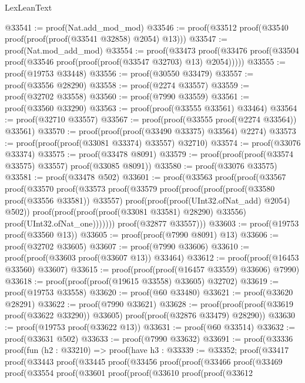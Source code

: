 \begin{lexlean}{LexLeanText}
\begin{coremodule}
@33541 := proof(Nat.add_mod_mod)
@33546 := proof(@33512 proof(@33540 proof(proof(proof(@33541 @32858) @2054) @13)))
@33547 := proof(Nat.mod_add_mod)
@33554 := proof(@33473
      proof(@33476 proof(@33504 proof(@33546 proof(proof(proof(@33547 @32703) @13) @2054)))))
@33555 := proof(@19753 @33448)
@33556 := proof(@30550 @33479)
@33557 := proof(@33556 @28290)
@33558 := proof(@2274 @33557)
@33559 := proof(@32702 @33558)
@33560 := proof(@7990 @33559)
@33561 := proof(@33560 @33290)
@33563 := proof(proof(@33555 @33561) @33464)
@33564 := proof(@32710 @33557)
@33567 := proof(proof(@33555 proof(@2274 @33564)) @33561)
@33570 := proof(proof(proof(@33490 @33375) @33564) @2274)
@33573 := proof(proof(proof(@33081 @33374) @33557) @32710)
@33574 := proof(@33076 @33374)
@33575 := proof(@33478 @8091)
@33579 := proof(proof(proof(@33574 @33575) @33557) proof(@33085 @8091))
@33580 := proof(@33076 @33575)
@33581 := proof(@33478 @502)
@33601 := proof(@33563
      proof(proof(@33567
            proof(@33570
                proof(@33573
                    proof(@33579
                        proof(proof(proof(proof(@33580 proof(@33556 @33581)) @33557)
                              proof(proof(proof(UInt32.ofNat_add) @2054) @502))
                            proof(proof(proof(proof(@33081 @33581) @28290) @33556)
                                proof(UInt32.ofNat_one)))))))
          proof(@32877 @33557)))
@33603 := proof(@19753 proof(@33560 @13))
@33605 := proof(proof(@7990 @8091) @13)
@33606 := proof(@32702 @33605)
@33607 := proof(@7990 @33606)
@33610 := proof(proof(@33603 proof(@33607 @13)) @33464)
@33612 := proof(proof(@16453 @33560) @33607)
@33615 := proof(proof(proof(@16457 @33559) @33606) @7990)
@33618 := proof(proof(proof(@19615 @33558) @33605) @32702)
@33619 := proof(@19753 @33558)
@33620 := proof(@60 @33480)
@33621 := proof(@33620 @28291)
@33622 := proof(@7990 @33621)
@33628 := proof(proof(proof(@33619 proof(@33622 @33290)) @33605) proof(proof(@32876 @33479) @28290))
@33630 := proof(@19753 proof(@33622 @13))
@33631 := proof(@60 @33514)
@33632 := proof(@33631 @502)
@33633 := proof(@7990 @33632)
@33691 := proof(@33336
      proof(fun (h2 : @33210) =>
        proof(have h3 : @33339 := @33352;
          proof(@33417
              proof(@33443
                  proof(@33445
                      proof(@33456
                          proof(proof(@33466
                                proof(@33469
                                    proof(@33554
                                        proof(@33601
                                            proof(proof(@33610
                                                  proof(proof(@33612

\end{coremodule}
\end{lexlean}
